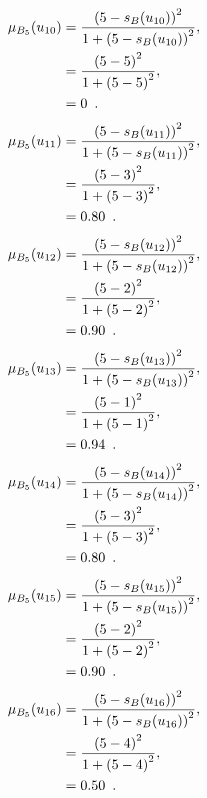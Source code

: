 \documentclass[a4paper,openany]{book}
\begin{document}
				\begin{align}
					\mu_{B_5}(u_{10}) &= \frac{\left(5-s_B(u_{10})\right)^2}{1 + \left(5-s_B(u_{10})\right)^2} ,\\
					&= \frac{\left(5-5\right)^2}{1 + \left(5-5\right)^2} \notag ,\\
					&= 0 \enspace. \notag
				\end{align}
				\begin{align}
					\mu_{B_5}(u_{11}) &= \frac{\left(5-s_B(u_{11})\right)^2}{1 + \left(5-s_B(u_{11})\right)^2} ,\\
					&= \frac{\left(5-3\right)^2}{1 + \left(5-3\right)^2} \notag ,\\
					&= 0.80 \enspace. \notag
				\end{align}
				\begin{align}
					\mu_{B_5}(u_{12}) &= \frac{\left(5-s_B(u_{12})\right)^2}{1 + \left(5-s_B(u_{12})\right)^2} ,\\
					&= \frac{\left(5-2\right)^2}{1 + \left(5-2\right)^2} \notag ,\\
					&= 0.90 \enspace. \notag
				\end{align}
				\begin{align}
					\mu_{B_5}(u_{13}) &= \frac{\left(5-s_B(u_{13})\right)^2}{1 + \left(5-s_B(u_{13})\right)^2} ,\\
					&= \frac{\left(5-1\right)^2}{1 + \left(5-1\right)^2} \notag ,\\
					&= 0.94 \enspace. \notag
				\end{align}
				\begin{align}
					\mu_{B_5}(u_{14}) &= \frac{\left(5-s_B(u_{14})\right)^2}{1 + \left(5-s_B(u_{14})\right)^2} ,\\
					&= \frac{\left(5-3\right)^2}{1 + \left(5-3\right)^2} \notag ,\\
					&= 0.80 \enspace. \notag
				\end{align}
				\begin{align}
					\mu_{B_5}(u_{15}) &= \frac{\left(5-s_B(u_{15})\right)^2}{1 + \left(5-s_B(u_{15})\right)^2} ,\\
					&= \frac{\left(5-2\right)^2}{1 + \left(5-2\right)^2} \notag ,\\
					&= 0.90 \enspace. \notag
				\end{align}
				\begin{align}
					\mu_{B_5}(u_{16}) &= \frac{\left(5-s_B(u_{16})\right)^2}{1 + \left(5-s_B(u_{16})\right)^2} ,\\
					&= \frac{\left(5-4\right)^2}{1 + \left(5-4\right)^2} \notag ,\\
					&= 0.50 \enspace. \notag
				\end{align}
\end{document}
